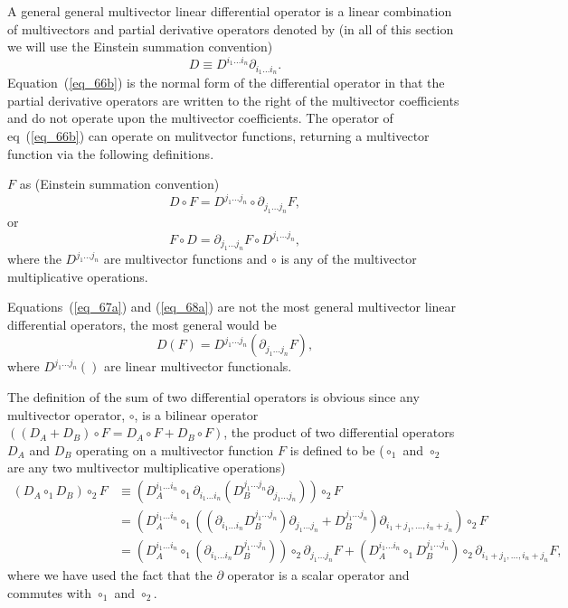 \documentclass[12pt]{report}
\newcommand{\lp}{\left (}
\newcommand{\rp}{\right )}
\newcommand{\f}[2]{{#1}\lp {#2} \rp}
\newcommand{\paren}[1]{\lp {#1} \rp}
\newcommand{\be}{\begin{equation}}
\newcommand{\ee}{\end{equation}}
\begin{document}
A general general multivector linear differential operator is a linear combination of multivectors and partial derivative operators
denoted by (in all of this section we will use the Einstein summation convention)
\be\label{eq_66b}
    D \equiv D^{i_{1}\dots i_{n}}\partial_{i_{1}\dots i_{n}}.
\ee
Equation~(\ref{eq_66b}) is the normal form of the differential operator in that the partial derivative operators are written to the right
of the multivector coefficients and do not operate upon the multivector coefficients.
The operator of eq~(\ref{eq_66b}) can operate on mulitvector functions, returning a multivector function via the following definitions.


$F$ as (Einstein summation convention)
\be\label{eq_67a}
    D\circ F = D^{j_{1}\dots j_{n}}\circ\partial_{j_{1}\dots j_{n}}F,
\ee
or
\be\label{eq_68a}
    F\circ D = \partial_{j_{1}\dots j_{n}}F\circ D^{j_{1}\dots j_{n}},
\ee
where the $D^{j_{1}\dots j_{n}}$ are multivector functions and $\circ$ is any of the multivector multiplicative operations.

Equations~(\ref{eq_67a}) and (\ref{eq_68a}) are not the most general multivector linear differential operators, the most general would be
\be
    \f{D}{F} = \f{D^{j_{1}\dots j_{n}}}{\partial_{j_{1}\dots j_{n}}F},
\ee
where $\f{D^{j_{1}\dots j_{n}}}{}$ are linear multivector functionals.

The definition of the sum of two differential operators is obvious since any multivector operator, $\circ$, is a bilinear operator
$\paren{\paren{D_{A}+D_{B}}\circ F = D_{A}\circ F+D_{B}\circ F}$, the product of two differential operators $D_{A}$ and $D_{B}$ operating on a multivector function $F$ is defined to be ($\circ_{1}$ and $\circ_{2}$ are any two multivector multiplicative operations)
\begin{align*}
    \paren{D_{A}\circ_{1}D_{B}}\circ_{2}F &\equiv \paren{D_{A}^{i_{1}\dots i_{n}}\circ_{1}
                                                  \partial_{i_{1}\dots i_{n}}\paren{D_{B}^{j_{1}\dots j_{n}}
                                                  \partial_{j_{1}\dots j_{n}}}}\circ_{2}F \nonumber \\
                                          &= \paren{D_{A}^{i_{1}\dots i_{n}}\circ_{1}
                                             \paren{\paren{\partial_{i_{1}\dots i_{n}}D_{B}^{j_{1}\dots j_{n}}}
                                             \partial_{j_{1}\dots j_{n}}+
                                             D_{B}^{j_{1}\dots j_{n}}}
                                             \partial_{i_{1}+j_{1},\dots, i_{n}+j_{n}}}\circ_{2}F \nonumber \\
                                          &= \paren{D_{A}^{i_{1}\dots i_{n}}\circ_{1}\paren{\partial_{i_{1}\dots i_{n}}D_{B}^{j_{1}\dots j_{n}}}}
                                             \circ_{2}\partial_{j_{1}\dots j_{n}}F+
                                             \paren{D_{A}^{i_{1}\dots i_{n}}\circ_{1}D_{B}^{j_{1}\dots j_{n}}}
                                             \circ_{2}\partial_{i_{1}+j_{1},\dots, i_{n}+j_{n}}F,
\end{align*}
where we have used the fact that the $\partial$ operator is a scalar operator and commutes with $\circ_{1}$ and $\circ_{2}$.
\end{document}
